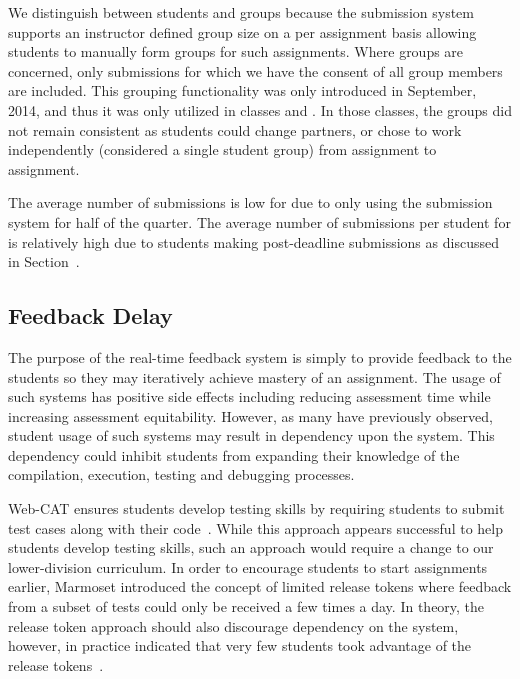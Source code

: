 We distinguish between students and groups because the submission system
supports an instructor defined group size on a per assignment basis allowing
students to manually form groups for such assignments. Where groups are
concerned, only submissions for which we have the consent of all group members
are included. This grouping functionality was only introduced in September,
2014, and thus it was only utilized in classes  and . In
those classes, the groups did not remain consistent as students could change
partners, or chose to work independently (considered a single student group)
from assignment to assignment.

The average number of submissions is low for  due to only using the
submission system for half of the quarter. The average number of submissions
per student for  is relatively high due to students making
post-deadline submissions as discussed in Section~.


\subsection{Feedback Delay}
The purpose of the real-time feedback system is simply to provide feedback to
the students so they may iteratively achieve mastery of an assignment. The
usage of such systems has positive side effects including reducing assessment
time while increasing assessment equitability. However, as many have previously
observed, student usage of such systems may result in dependency upon the
system. This dependency could inhibit students from expanding their knowledge
of the compilation, execution, testing and debugging processes.

Web-CAT ensures students develop testing skills by requiring students to submit
test cases along with their code~\cite{Edwards:2003:RCS:949344.949390}. While
this approach appears successful to help students develop testing skills, such
an approach would require a change to our lower-division curriculum. In order
to encourage students to start assignments earlier, Marmoset introduced the
concept of limited release tokens where feedback from a subset of tests could
only be received a few times a day. In theory, the release token approach
should also discourage dependency on the system, however, in practice \spacco{}
indicated that very few students took advantage of the release
tokens~\cite{Spacco:2013:TIP:2462476.2465594}.

